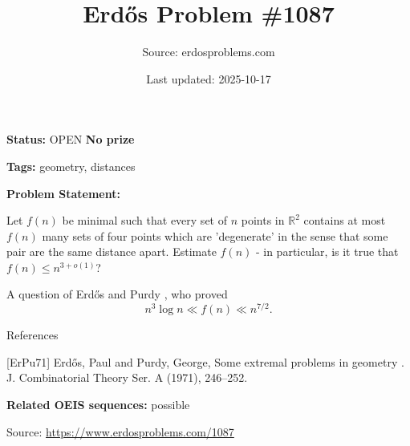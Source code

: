 \documentclass{article}
\title{Erd\H{o}s Problem \#1087}
\date{Last updated: 2025-10-17}
\author{Source: erdosproblems.com}
\begin{document}
\maketitle

\noindent\textbf{Status:} OPEN \quad \textbf{No prize}

\noindent\textbf{Tags:} geometry, distances

\medskip

\noindent\textbf{Problem Statement:}

Let $f(n)$ be minimal such that every set of $n$ points in $\mathbb{R}^2$ contains at most $f(n)$ many sets of four points which are 'degenerate' in the sense that some pair are the same distance apart. Estimate $f(n)$ - in particular, is it true that $f(n)\leq n^{3+o(1)}$?




A question of Erd\H{o}s and Purdy \cite{ErPu71}, who proved\[n^3\log n \ll f(n) \ll n^{7/2}.\]




References

[ErPu71] Erd\H{o}s, Paul and Purdy, George, Some extremal problems in geometry . J. Combinatorial Theory Ser. A (1971), 246--252.

\noindent\textbf{Related OEIS sequences:} possible


\bigskip
\noindent\small{Source: \url{https://www.erdosproblems.com/1087}}
\end{document}

